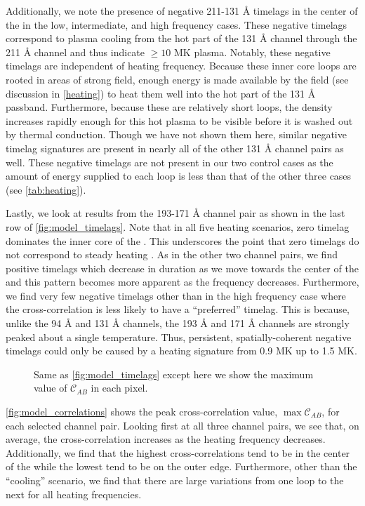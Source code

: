 Additionally, we note the presence of negative 211-131 \AA{} timelags in the center of the \AR{} in the low, intermediate, and high frequency cases. These negative timelags correspond to plasma cooling from the hot part of the 131 \AA{} channel through the 211 \AA{} channel and thus indicate  $\ge10$ MK plasma. Notably, these negative timelags are independent of heating frequency. Because these inner core loops are rooted in areas of strong field, enough energy is made available by the field (see discussion in \autoref{heating}) to heat  them well into the hot part of the 131 \AA{} passband. Furthermore, because these are relatively short loops, the density increases rapidly enough for this hot plasma to be visible before it is washed out by thermal conduction. Though we have not shown them here, similar negative timelag signatures are present in nearly all of the other 131 \AA{} channel pairs as well. These negative timelags are not present in our two control cases as the amount of energy supplied to each loop is less than that of the other three cases (see \autoref{tab:heating}).

Lastly, we look at results from the 193-171 \AA{} channel pair as shown in the last row of \autoref{fig:model_timelags}. Note that in all five heating scenarios, zero timelag dominates the inner core of the \AR{}. This underscores the point that zero timelags do not correspond to steady heating \citep[see][]{viall_transition_2015,viall_signatures_2016}. As in the other two channel pairs, we find positive timelags which decrease in duration as we move towards the center of the \AR{} and this pattern becomes more apparent as the frequency decreases. Furthermore, we find very few negative timelags other than in the high frequency case where the cross-correlation is less likely to have a ``preferred'' timelag. This is because, unlike the 94 \AA{} and 131 \AA{} channels, the 193 \AA{} and 171 \AA{} channels are strongly peaked about a single temperature. Thus, persistent, spatially-coherent negative timelags could only be caused by a heating signature from 0.9 MK up to 1.5 MK. 

\begin{figure*}
    \caption{Same as \autoref{fig:model_timelags} except here we show the maximum value of $\mathcal{C}_{AB}$ in each pixel.}
    \label{fig:model_correlations}
\end{figure*}

\autoref{fig:model_correlations} shows the peak cross-correlation value, $\max\mathcal{C}_{AB}$, for each selected channel pair. Looking first at all three channel pairs, we see that, on average, the cross-correlation increases as the heating frequency decreases. Additionally, we find that the highest cross-correlations tend to be in the center of the \AR{} while the lowest tend to be on the outer edge. Furthermore, other than the ``cooling'' scenario, we find that there are large variations from one loop to the next for all heating frequencies.  


